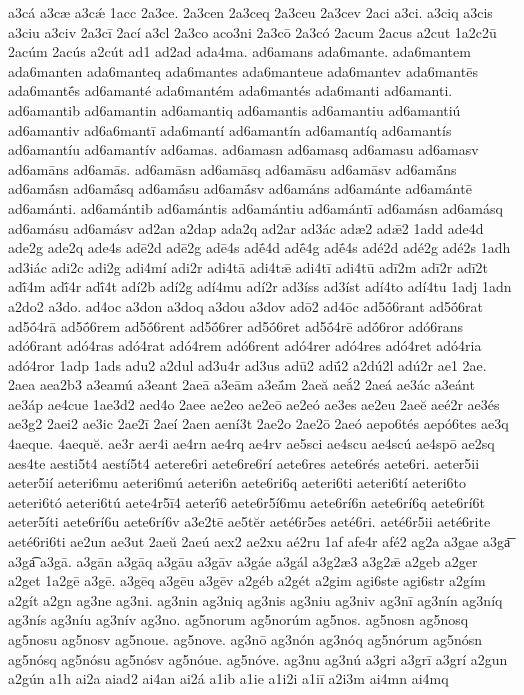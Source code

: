 {a3cá
a3cæ
a3cǽ
1acc
2a3ce.
2a3cen
2a3ceq
2a3ceu
2a3cev
2aci
a3ci.
a3ciq
a3cis
a3ciu
a3civ
2a3cī
2ací
a3cl
2a3co
aco3ni
2a3cō
2a3có
2acum
2acus
a2cut
1a2c2ū
2acúm
2acús
a2cút
ad1
ad2ad
ada4ma.
ad6amans
ada6mante.
ada6mantem
ada6manten
ada6manteq
ada6mantes
ada6manteue
ada6mantev
ada6mantēs
ada6mantḗs
ad6amanté
ada6mantém
ada6mantés
ada6manti
ad6amanti.
ad6amantib
ad6amantin
ad6amantiq
ad6amantis
ad6amantiu
ad6amantiú
ad6amantiv
ad6a6mantī
ada6mantí
ad6amantín
ad6amantíq
ad6amantís
ad6amantíu
ad6amantív
ad6amas.
ad6amasn
ad6amasq
ad6amasu
ad6amasv
ad6amāns
ad6amās.
ad6amāsn
ad6amāsq
ad6amāsu
ad6amāsv
ad6amā́ns
ad6amā́sn
ad6amā́sq
ad6amā́su
ad6amā́sv
ad6amáns
ad6amánte
ad6amántē
ad6amánti.
ad6amántib
ad6amántis
ad6amántiu
ad6amántī
ad6amásn
ad6amásq
ad6amásu
ad6amásv
ad2an
a2dap
ada2q
ad2ar
ad3ác
adæ2
adǣ2
1add
ade4d
ade2g
ade2q
ade4s
adē2d
adē2g
adē4s
adḗ4d
adḗ4g
adḗ4s
adé2d
adé2g
adé2s
1adh
ad3iác
adi2c
adi2g
adi4mí
adi2r
adi4tā
adi4tǣ
adi4tī
adi4tū
adī2m
adī2r
adī2t
adī́4m
adī́4r
adī́4t
adí2b
adí2g
adí4mu
adí2r
ad3íss
ad3íst
adí4to
adí4tu
1adj
1adn
a2do2
a3do.
ad4oc
a3don
a3doq
a3dou
a3dov
adō2
ad4ōc
ad5ṓ6rant
ad5ṓ6rat
ad5ṓ4rā
ad5ṓ6rem
ad5ṓ6rent
ad5ṓ6rer
ad5ṓ6ret
ad5ṓ4rē
adṓ6ror
adó6rans
adó6rant
adó4ras
adó4rat
adó4rem
adó6rent
adó4rer
adó4res
adó4ret
adó4ria
adó4ror
1adp
1ads
adu2
a2dul
ad3u4r
ad3us
adū2
adū́2
a2dú2l
adú2r
ae1
2ae.
2aea
aea2b3
a3eamú
a3eant
2aeā
a3eām
a3eā́m
2aeă
aeắ2
2aeá
ae3ác
a3eánt
ae3áp
ae4cue
1ae3d2
aed4o
2aee
ae2eo
ae2eō
ae2eó
ae3es
ae2eu
2aeĕ
aeé2r
ae3és
ae3g2
2aei2
ae3ic
2ae2ī
2aeí
2aen
aení3t
2ae2o
2ae2ō
2aeó
aepo6tés
aepó6tes
ae3q
4aeque.
4aequĕ.
ae3r
aer4i
ae4rn
ae4rq
ae4rv
ae5sci
ae4scu
ae4scú
ae4spō
ae2sq
aes4te
aesti5t4
aestí5t4
aetere6ri
aete6re6rí
aete6res
aete6rés
aete6ri.
aeter5ii
aeter5ií
aeteri6mu
aeteri6mú
aeteri6n
aete6ri6q
aeteri6ti
aeteri6tí
aeteri6to
aeteri6tó
aeteri6tú
aete4r5ī4
aeterī́6
aete6r5í6mu
aete6rí6n
aete6rí6q
aete6rí6t
aeter5íti
aete6rí6u
aete6rí6v
a3e2tē
ae5tĕr
aeté6r5es
aeté6ri.
aeté6r5ii
aeté6rite
aeté6ri6ti
ae2un
ae3ut
2aeŭ
2aeú
aex2
ae2xu
aé2ru
1af
afe4r
afé2
ag2a
a3gae
a3ga͞
a3ga͡
a3gā.
a3gān
a3gāq
a3gāu
a3gāv
a3gáe
a3gál
a3g2æ3
a3g2ǣ
a2geb
a2ger
a2get
1a2gē
a3gē.
a3gēq
a3gēu
a3gēv
a2géb
a2gét
a2gim
agi6ste
agi6str
a2gím
a2gít
a2gn
ag3ne
ag3ni.
ag3nin
ag3niq
ag3nis
ag3niu
ag3niv
ag3nī
ag3nín
ag3níq
ag3nís
ag3níu
ag3nív
ag3no.
ag5norum
ag5norúm
ag5nos.
ag5nosn
ag5nosq
ag5nosu
ag5nosv
ag5noue.
ag5nove.
ag3nō
ag3nón
ag3nóq
ag5nórum
ag5nósn
ag5nósq
ag5nósu
ag5nósv
ag5nóue.
ag5nóve.
ag3nu
ag3nú
a3gri
a3grī
a3grí
a2gun
a2gún
a1h
ai2a
aiad2
ai4an
ai2á
a1ib
a1ie
a1i2i
a1iī
a2i3m
ai4mn
ai4mq
}
